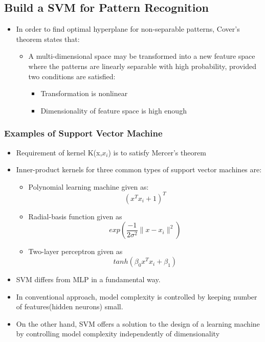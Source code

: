 \documentclass[12pt]{article}
\begin{document}
\subsection{Build a SVM for Pattern Recognition}

\begin{itemize}
	\item In order to find optimal hyperplane for non-separable patterns, Cover's theorem states that:
		\begin{itemize}
			\item A multi-dimensional space may be transformed into a new feature space where the patterns are linearly separable with high probability, provided two conditions are satisfied:
				\begin{itemize}
					\item Transformation is nonlinear
					\item Dimensionality of feature space is high enough
				\end{itemize}
		\end{itemize}
\end{itemize}

\subsubsection{Examples of Support Vector Machine}

\begin{itemize}
	\item Requirement of kernel K(x,$x_{i}$) is to satisfy Mercer's theorem
	\item Inner-product kernels for three common types of support vector machines are:
		\begin{itemize}
			\item Polynomial learning machine given as: $$(x^Tx_{i}  + 1)^ T $$
				
			\item Radial-basis function given as $$ exp(\frac{-1}{2 \sigma^{2}} \lVert x - x_{i}\rVert ^{2}) $$
			\item Two-layer perceptron given as $$ tanh(\beta_{0}x^Tx_{i} + \beta_{1})$$
		\end{itemize}
	\item SVM differs from MLP  in a fundamental way.
	\item In conventional approach, model complexity is controlled by keeping number of features(hidden neurons) small.
	\item On the other hand, SVM offers a solution to the design of a learning machine by controlling model complexity independently of dimensionality
\end{itemize}
\end{document}
